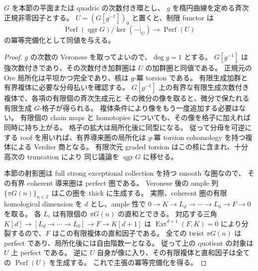 \begin{lemma}\label{lem:normal-projective-localization}
$G$ を本節の平面または quadric の次数付き環とし、
$g$ を楕円曲線を定める斉次正規非零因子とする。
$U=(G[g^{-1}])_0$ と置くと、制限 functor は
\[
 \operatorname{Perf}(\operatorname{qgr}G)/\ker(-|_U)
 \longrightarrow\operatorname{Perf}(U)
\]
の冪等完備化として同値を与える。
\end{lemma}
\begin{proof}
$g$ の次数の Veronese を取ってよいので、$\deg g=1$ とする。
$G[g^{-1}]$ は強次数付きであり、その次数付き加群圏は $U$ の加群圏と同値である。
正規元の Ore 局所化は平坦かつ完全であり、核は $g$-冪 torsion である。
有限生成加群と有界複体に必要な分母払いを確認する。
$G[g^{-1}]$ 上の有界な有限生成次数付き複体で、各項の有限個の斉次生成元と
その微分の像を取ると、微分で保たれる有限生成 $G$-格子が得られる。
複体条件により像をもう一度追加する必要はない。
有限個の chain maps と homotopies についても、その像を格子に加えれば同時に持ち上がる。
格子の拡大は局所化後に同型になる。
従って分母を可逆にする roof を用いれば、有界導来圏の局所化は
$g$-冪 torsion cohomology を持つ複体による Verdier 商となる。
有限次元 graded torsion はこの核に含まれ、十分高次の truncation により
同じ議論を $\operatorname{qgr}G$ に移せる。

本節の射影圏は full strong exceptional collection を持つ smooth な圏なので、
その有界 coherent 導来圏は perfect 圏である。
Veronese 後の ample 列 $\{\pi G(n)\}_{n\in\mathbb Z}$ はこの圏を thick に生成する。
実際、coherent 圏の有限 homological dimension を $d$ とし、ample 性で
$0\to K\to L_d\to\cdots\to L_0\to F\to0$ を取る。
各 $L_i$ は有限個の $\pi G(n)$ の直和とできる。
対応する三角 $K[d]\to[L_d\to\cdots\to L_0]\to F\to K[d+1]$ は
$\operatorname{Ext}^{d+1}(F,K)=0$ により分裂するので、$F$ はこの有限複体の直和因子である。
全ての twist $\pi G(n)$ は perfect であり、局所化後には自由階数一となる。
従って上の quotient の対象は $U$ 上 perfect である。
逆に $U$ 自身が像に入り、その有限複体と直和因子は全ての
$\operatorname{Perf}(U)$ を生成する。
これで主張の冪等完備化を得る。
\end{proof}

